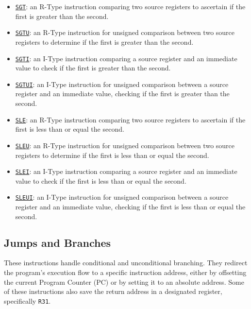 \begin{itemize}
 	\item \underline{\texttt{SGT}}: an R-Type instruction comparing two source registers to ascertain if the first is greater than the second.
	\item \underline{\texttt{SGTU}}: an R-Type instruction for unsigned comparison between two source registers to determine if the first is greater than the second.
	\item \underline{\texttt{SGTI}}: an I-Type instruction comparing a source register and an immediate value to check if the first is greater than the second.
	\item \underline{\texttt{SGTUI}}: an I-Type instruction for unsigned comparison between a source register and an immediate value, checking if the first is greater than the second.
 
        \item \underline{\texttt{SLE}}: an R-Type instruction comparing two source registers to ascertain if the first is less than or equal the second.
        \item \underline{\texttt{SLEU}}: an R-Type instruction for unsigned comparison between two source registers to determine if the first is less than or equal the second.
	\item \underline{\texttt{SLEI}}: an I-Type instruction comparing a source register and an immediate value to check if the first is less than or equal the second.
	\item \underline{\texttt{SLEUI}}: an I-Type instruction for unsigned comparison between a source register and an immediate value, checking if the first is less than or equal the second.
\end{itemize}

\subsection{Jumps and Branches}
These instructions handle conditional and unconditional branching. They redirect the program's execution flow to a specific instruction address, either by offsetting the current Program Counter (PC) or by setting it to an absolute address. Some of these instructions also save the return address in a designated register, specifically \texttt{R31}.

